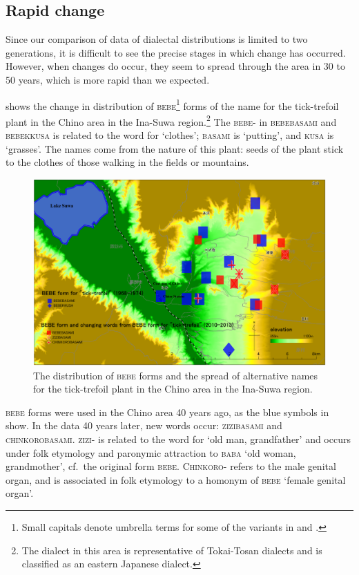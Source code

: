 \documentclass[output=paper]{LSP/langsci}
\begin{document}
\subsection{Rapid change}
Since our comparison of  data of dialectal distributions is limited to two generations, it is difficult to see the precise stages in which change has occurred. However, when changes do occur, they seem to spread through the area in 30 to 50 years, which is more rapid than we expected.

 shows the change in distribution of \textsc{bebe}\footnote{ Small capitals denote umbrella terms for some of the variants in  and .} forms of the name for the tick-trefoil plant in the Chino area in the Ina-Suwa region.\footnote{ The dialect in this area is representative of Tokai-Tosan dialects and is classified as an eastern Japanese dialect.} The \textsc{bebe-} in \textsc{bebebasami} and \textsc{bebekkusa} is related to the word for `clothes'; \textsc{basami} is `putting', and \textsc{kusa} is `grasses'. The names come from the nature of this plant: seeds of the plant stick to the clothes of those walking in the fields or mountains.

\begin{figure}
\includegraphics[height=.4\textheight]{illustrations/onishi_fig5}
\caption{The distribution of \textsc{bebe} forms and the spread of alternative names for the tick-trefoil plant in the Chino area in the Ina-Suwa region.}
\label{fig:5}
\end{figure}


\largerpage
\textsc{bebe} forms were used in the Chino area 40 years ago, as the blue symbols in  show. In the data 40 years later, new words occur: \textsc{zizibasami} and \textsc{chinkorobasami}.  \textsc{zizi-} is related to the word for `old man, grandfather' and occurs under folk etymology and paronymic attraction to \textsc{baba} `old woman, grandmother', cf.\ the original form \textsc{bebe}. \textsc{Chinkoro-} refers to the male genital organ, and is associated in folk etymology to a homonym of \textsc{bebe} `female genital organ'.
\end{document}
